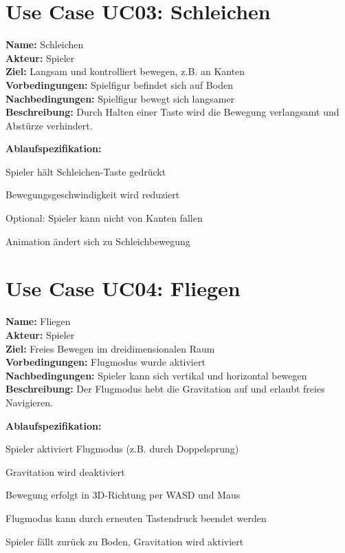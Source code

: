 \documentclass{article}
\newcommand{\opt}{\ensuremath{\parallel}}
\begin{document}
\section*{Use Case UC03: Schleichen}

\textbf{Name:} Schleichen \\
\textbf{Akteur:} Spieler \\
\textbf{Ziel:} Langsam und kontrolliert bewegen, z.B. an Kanten \\
\textbf{Vorbedingungen:} Spielfigur befindet sich auf Boden \\
\textbf{Nachbedingungen:} Spielfigur bewegt sich langsamer \\
\textbf{Beschreibung:} Durch Halten einer Taste wird die Bewegung verlangsamt und Abstürze verhindert.

\textbf{Ablaufspezifikation:}
\begin{description}[style=nextline,leftmargin=1.5cm,labelwidth=1.2cm]
  \item[1.] Spieler hält Schleichen-Taste gedrückt
  \item[2.] Bewegungsgeschwindigkeit wird reduziert
  \item[2\opt a.] Optional: Spieler kann nicht von Kanten fallen
  \item[3.] Animation ändert sich zu Schleichbewegung
\end{description}


\section*{Use Case UC04: Fliegen}

\textbf{Name:} Fliegen \\
\textbf{Akteur:} Spieler \\
\textbf{Ziel:} Freies Bewegen im dreidimensionalen Raum \\
\textbf{Vorbedingungen:} Flugmodus wurde aktiviert \\
\textbf{Nachbedingungen:} Spieler kann sich vertikal und horizontal bewegen \\
\textbf{Beschreibung:} Der Flugmodus hebt die Gravitation auf und erlaubt freies Navigieren.

\textbf{Ablaufspezifikation:}
\begin{description}[style=nextline,leftmargin=1.5cm,labelwidth=1.2cm]
  \item[1.] Spieler aktiviert Flugmodus (z.B. durch Doppelsprung)
  \item[2.] Gravitation wird deaktiviert
  \item[3.] Bewegung erfolgt in 3D-Richtung per WASD und Maus
  \item[4.] Flugmodus kann durch erneuten Tastendruck beendet werden
  \item[4a.] Spieler fällt zurück zu Boden, Gravitation wird aktiviert
\end{description}
\end{document}
